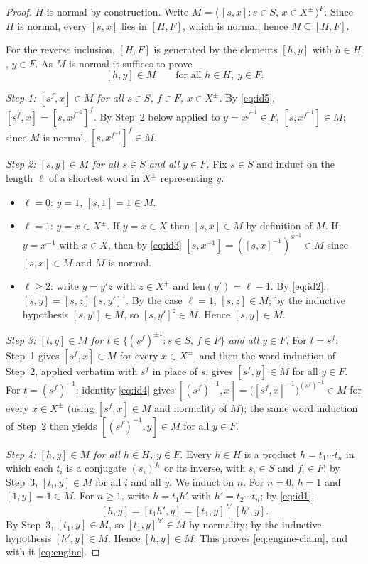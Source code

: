 \documentclass{amsart}
\theoremstyle{definition}
\theoremstyle{remark}
\begin{document}
\begin{proof}
$H$ is normal by construction. Write
$M=\langle\,[s,x]:s\in S,\,x\in X^{\pm}\,\rangle^{F}$. Since $H$ is normal, every
$[s,x]$ lies in $[H,F]$, which is normal; hence $M\subseteq[H,F]$.

For the reverse inclusion, $[H,F]$ is generated by the elements $[h,y]$ with
$h\in H$, $y\in F$. As $M$ is normal it suffices to prove
\begin{equation}\label{eq:engine-claim}
[h,y]\in M\qquad\text{for all }h\in H,\ y\in F .
\end{equation}

\smallskip
\emph{Step 1: $[s^{f},x]\in M$ for all $s\in S$, $f\in F$, $x\in X^{\pm}$.}
By \eqref{eq:id5}, $[s^{f},x]=[s,x^{f^{-1}}]^{f}$. By Step~2 below applied to
$y=x^{f^{-1}}\in F$, $[s,x^{f^{-1}}]\in M$; since $M$ is normal,
$[s,x^{f^{-1}}]^{f}\in M$.

\smallskip
\emph{Step 2: $[s,y]\in M$ for all $s\in S$ and all $y\in F$.}
Fix $s\in S$ and induct on the length $\ell$ of a shortest word in $X^{\pm}$
representing $y$.
\begin{itemize}
\item $\ell=0$: $y=1$, $[s,1]=1\in M$.
\item $\ell=1$: $y=x\in X^{\pm}$. If $y=x\in X$ then $[s,x]\in M$ by definition of
$M$. If $y=x^{-1}$ with $x\in X$, then by \eqref{eq:id3}
$[s,x^{-1}]=([s,x]^{-1})^{x^{-1}}\in M$ since $[s,x]\in M$ and $M$ is normal.
\item $\ell\ge2$: write $y=y'z$ with $z\in X^{\pm}$ and $\mathrm{len}(y')=\ell-1$.
By \eqref{eq:id2}, $[s,y]=[s,z]\,[s,y']^{z}$. By the case $\ell=1$, $[s,z]\in M$;
by the inductive hypothesis $[s,y']\in M$, so $[s,y']^{z}\in M$. Hence
$[s,y]\in M$.
\end{itemize}

\smallskip
\emph{Step 3: $[t,y]\in M$ for $t\in\{(s^{f})^{\pm1}:s\in S,\,f\in F\}$ and all
$y\in F$.}
For $t=s^{f}$: Step~1 gives $[s^{f},x]\in M$ for every $x\in X^{\pm}$, and then
the word induction of Step~2, applied verbatim with $s^{f}$ in place of $s$,
gives $[s^{f},y]\in M$ for all $y\in F$. For $t=(s^{f})^{-1}$: identity
\eqref{eq:id4} gives
$[(s^{f})^{-1},x]=\big([s^{f},x]^{-1}\big)^{(s^{f})^{-1}}\in M$ for every
$x\in X^{\pm}$ (using $[s^{f},x]\in M$ and normality of $M$); the same word
induction of Step~2 then yields $[(s^{f})^{-1},y]\in M$ for all $y\in F$.

\smallskip
\emph{Step 4: $[h,y]\in M$ for all $h\in H$, $y\in F$.}
Every $h\in H$ is a product $h=t_1\cdots t_n$ in which each $t_i$ is a conjugate
$(s_i)^{f_i}$ or its inverse, with $s_i\in S$ and $f_i\in F$; by Step~3,
$[t_i,y]\in M$ for all $i$ and all $y$. We induct on $n$. For $n=0$, $h=1$ and
$[1,y]=1\in M$. For $n\ge1$, write $h=t_1 h'$ with $h'=t_2\cdots t_n$; by
\eqref{eq:id1},
\[
[h,y]=[t_1 h',y]=[t_1,y]^{\,h'}\,[h',y].
\]
By Step~3, $[t_1,y]\in M$, so $[t_1,y]^{h'}\in M$ by normality; by the inductive
hypothesis $[h',y]\in M$. Hence $[h,y]\in M$. This proves
\eqref{eq:engine-claim}, and with it \eqref{eq:engine}.
\end{proof}
\end{document}
